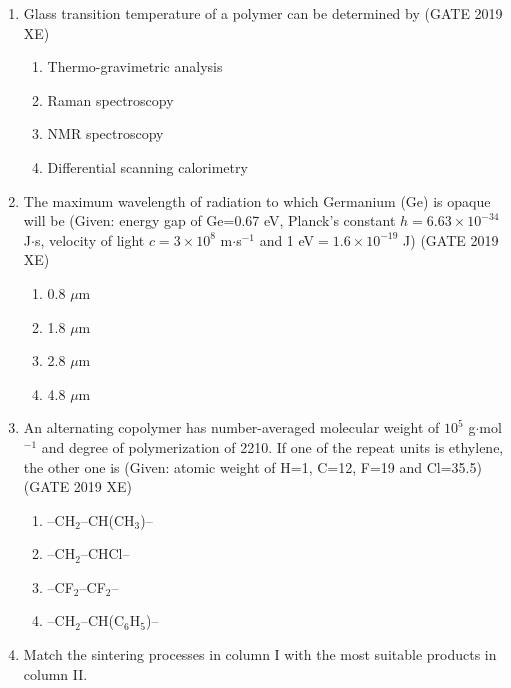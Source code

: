 \documentclass[journal,12pt,onecolumn]{IEEEtran}
\begin{document}
\begin{enumerate}
\item Glass transition temperature of a polymer can be determined by
\hfill{(GATE 2019 XE)} \\

\begin{multicols}{2}
\begin{enumerate}
\item Thermo-gravimetric analysis
\item Raman spectroscopy
\item NMR spectroscopy
\item Differential scanning calorimetry
\end{enumerate}
\end{multicols}

\item The maximum wavelength of radiation to which Germanium (Ge) is opaque will be (Given: energy gap of Ge=0.67 eV, Planck's constant $h=6.63\times10^{-34}$ J$\cdot$s, velocity of light $c=3\times10^{8}$ m$\cdot$s$^{-1}$ and 1 eV$=1.6\times10^{-19}$ J)
\hfill{(GATE 2019 XE)} \\

\begin{multicols}{2}
\begin{enumerate}
\item 0.8 $\mu$m
\item 1.8 $\mu$m
\item 2.8 $\mu$m
\item 4.8 $\mu$m
\end{enumerate}
\end{multicols}

\item An alternating copolymer has number-averaged molecular weight of $10^{5}$ g$\cdot$mol$^{-1}$ and degree of polymerization of 2210. If one of the repeat units is ethylene, the other one is (Given: atomic weight of H=1, C=12, F=19 and Cl=35.5)
\hfill{(GATE 2019 XE)} \\
\begin{multicols}{2}
\begin{enumerate}
\item --CH$_2$--CH(CH$_3$)--
\item --CH$_2$--CHCl--
\item --CF$_2$--CF$_2$--
\item --CH$_2$--CH(C$_6$H$_5$)--
\end{enumerate}
\end{multicols}

\item Match the sintering processes in column I with the most suitable products in column II.\\


\end{enumerate}
\end{document}
